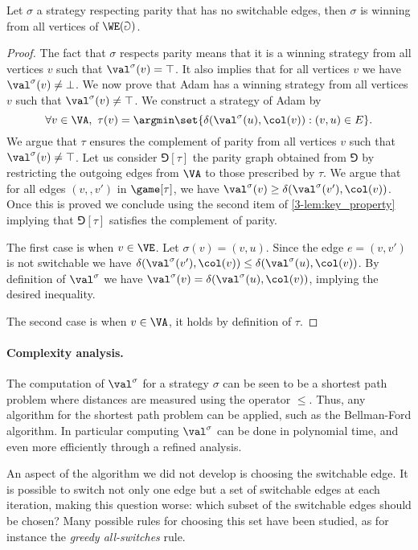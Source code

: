 \begin{lemma}[Optimality]
Let $\sigma$ a strategy respecting parity that has no switchable edges, then 
$\sigma$ is winning from all vertices of $\WE(\Game)$.
\end{lemma}

\begin{proof}
The fact that $\sigma$ respects parity means that it is a winning strategy
from all vertices $v$ such that $\val^\sigma(v) = \top$.
It also implies that for all vertices $v$ we have $\val^{\sigma}(v) \neq \bot$.
We now prove that Adam has a winning strategy from all vertices $v$ such that $\val^{\sigma}(v) \neq \top$.
We construct a strategy of Adam by
\[
\forall v \in \VA,\ \tau(v) = \argmin \set{ \delta(\val^{\sigma}(u),\col(v)) : (v,u) \in E }.
\]
We argue that $\tau$ ensures the complement of parity from all vertices $v$ such that $\val^{\sigma}(v) \neq \top$.
Let us consider $\Game[\tau]$ the parity graph obtained from $\Game$ by restricting the outgoing edges from $\VA$
to those prescribed by $\tau$.
We argue that for all edges $(v,,v')$ in $\game[\tau]$, we have 
$\val^{\sigma}(v) \ge \delta(\val^{\sigma}(v'),\col(v))$.
Once this is proved we conclude using the second item of \cref{3-lem:key_property} implying that $\Game[\tau]$ satisfies the complement of parity.

The first case is when $v \in \VE$. 
Let $\sigma(v) = (v,u)$.
Since the edge $e = (v,v')$ is not switchable we have 
$\delta(\val^{\sigma}(v'),\col(v)) \le \delta(\val^{\sigma}(u),\col(v))$.
By definition of $\val^\sigma$ we have $\val^\sigma(v) = \delta(\val^{\sigma}(u),\col(v))$,
implying the desired inequality.

The second case is when $v \in \VA$, it holds by definition of $\tau$.
\end{proof}

\paragraph{\bf Complexity analysis.}
The computation of $\val^\sigma$ for a strategy $\sigma$ can be seen to be a shortest path problem where distances are measured using the operator $\le$. 
Thus, any algorithm for the shortest path problem can be applied, such as the Bellman-Ford algorithm.
In particular computing $\val^\sigma$ can be done in polynomial time, and even more efficiently through a refined analysis.

An aspect of the algorithm we did not develop is choosing the switchable edge.
It is possible to switch not only one edge but a set of switchable edges at each iteration, making this question worse: 
which subset of the switchable edges should be chosen?
Many possible rules for choosing this set have been studied, as for instance the \emph{greedy all-switches} rule. 

